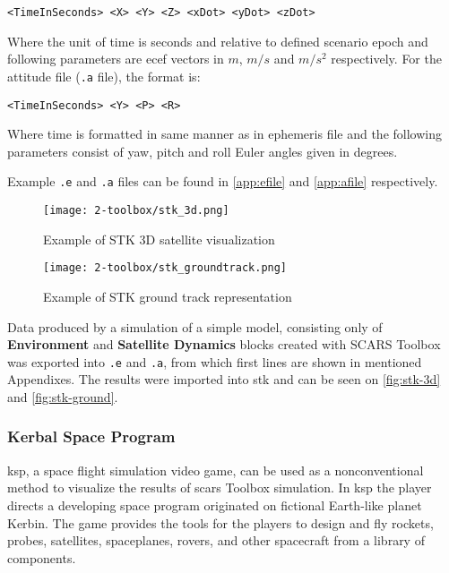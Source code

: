         \begin{Verbatim}[fontsize=\small]
<TimeInSeconds> <X> <Y> <Z> <xDot> <yDot> <zDot>
        \end{Verbatim}

        Where the unit of time is seconds and relative to defined scenario epoch and following parameters are \ac{ecef} vectors in $m$, $m/s$ and $m/s^2$ respectively. For the attitude file (\verb|.a| file), the format is:
        
        \begin{Verbatim}[fontsize=\small]
<TimeInSeconds> <Y> <P> <R>
        \end{Verbatim}
        
        Where time is formatted in same manner as in ephemeris file and the following parameters consist of yaw, pitch and roll Euler angles given in degrees.

        Example \verb|.e| and \verb|.a| files can be found in \autoref{app:efile} and \autoref{app:afile} respectively.


        \begin{figure}[H]
            \centering
            \texttt{[image: 2-toolbox/stk\_3d.png]}
            \caption{Example of STK 3D satellite visualization}
            \label{fig:stk-3d}
        \end{figure}

        \begin{figure}[H]
            \centering
            \texttt{[image: 2-toolbox/stk\_groundtrack.png]}
            \caption{Example of STK ground track representation}
            \label{fig:stk-ground}
        \end{figure}

        Data produced by a simulation of a simple model, consisting only of \textbf{Environment} and \textbf{Satellite Dynamics} blocks created with SCARS Toolbox was exported into  \verb|.e| and \verb|.a|, from which first lines are shown in mentioned Appendixes. The results were imported into \ac{stk} and can be seen on \autoref{fig:stk-3d} and \autoref{fig:stk-ground}.


    \subsubsection{Kerbal Space Program}\label{sec:ksp}
        \ac{ksp}, a space flight simulation video game, can be used as a nonconventional method to visualize the results of \ac{scars} Toolbox simulation. In \ac{ksp} the player directs a developing space program originated on fictional Earth-like planet Kerbin. The game provides the tools for the players to design and fly rockets, probes, satellites, spaceplanes, rovers, and other spacecraft from a library of components\cite{kerbals}. 

